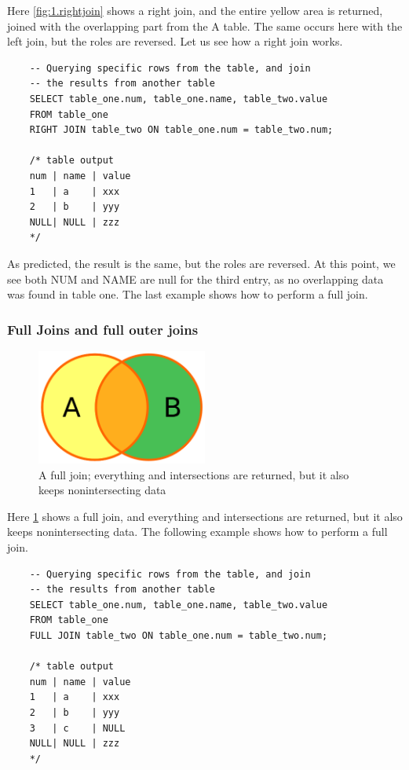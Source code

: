 Here \cref{fig:1.rightjoin} shows a right join, and the entire yellow area is returned, joined with the overlapping part from the A table. The same occurs here with the left join, but the roles are reversed. Let us see how a right join works.

\begin{verbatim}
    -- Querying specific rows from the table, and join 
    -- the results from another table
    SELECT table_one.num, table_one.name, table_two.value
    FROM table_one
    RIGHT JOIN table_two ON table_one.num = table_two.num;

    /* table output
    num | name | value
    1   | a    | xxx
    2   | b    | yyy
    NULL| NULL | zzz
    */
\end{verbatim}

As predicted, the result is the same, but the roles are reversed. At this point, we see both NUM and NAME are null for the third entry, as no overlapping data was found in table one. The last example shows how to perform a full join.

\subsubsection{Full Joins and full outer joins}

\begin{figure}[H]
    \centering
    \includegraphics[width=0.5\textwidth]{content/1-relational-databases/figures/joins/fulljoin.png}
    \caption{A full join; everything and intersections are returned, but it also keeps nonintersecting data}
    \label{fig:1.fulljoin}
\end{figure}

Here \cref{fig:1.fulljoin} shows a full join, and everything and intersections are returned, but it also keeps nonintersecting data. The following example shows how to perform a full join.

\begin{verbatim}
    -- Querying specific rows from the table, and join 
    -- the results from another table
    SELECT table_one.num, table_one.name, table_two.value
    FROM table_one
    FULL JOIN table_two ON table_one.num = table_two.num;

    /* table output
    num | name | value
    1   | a    | xxx
    2   | b    | yyy
    3   | c    | NULL
    NULL| NULL | zzz
    */
\end{verbatim}

